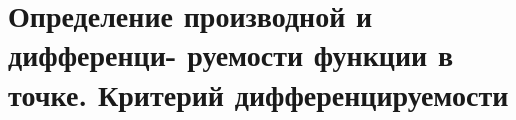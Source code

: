 \section{Определение производной и дифференци- руемости функции в точке. Критерий дифференцируемости}